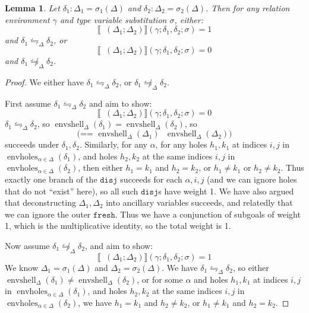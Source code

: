 \documentclass{report}
\newtheorem{lemma}{Lemma}
\theoremstyle{definition}
\newcommand{\den}[1]{\llbracket #1 \rrbracket}
\DeclareMathOperator{\envshell}{envshell}
\DeclareMathOperator{\envholes}{envholes}
\newcommand{\eqpat}{\leftrightharpoons}
\newcommand{\eqpatD}{\eqpat_{\Delta}}
\DeclareMathOperator{\enforceeqpatD}{enforce_{\eqpatD}}
\begin{document}
\begin{lemma}
	\label{lem:enforce_eqpat}
	Let \(\delta_1 : \Delta_1 = \sigma_1(\Delta)\) and \(\delta_2 : \Delta_2 = \sigma_2(\Delta)\).
	Then for any relation environment \(\gamma\) and type variable substitution \(\sigma\),
	either:
	\[
		\den{\enforceeqpatD(\Delta_1;\Delta_2)}(\gamma;\delta_1,\delta_2;\sigma) = 1
	\]
	and \(\delta_1 \eqpatD \delta_2\),
	or
	\[
		\den{\enforceeqpatD(\Delta_1;\Delta_2)}(\gamma;\delta_1,\delta_2;\sigma) = 0
	\]
	and \(\delta_1 \not\eqpatD \delta_2\).
\end{lemma}
\begin{proof}
	We either have \(\delta_1 \eqpatD \delta_2\), or \(\delta_1 \not\eqpatD \delta_2\).

	First assume \(\delta_1 \eqpatD \delta_2\) and aim to show:
	\begin{equation}
		\den{\enforceeqpatD(\Delta_1;\Delta_2)}(\gamma;\delta_1,\delta_2;\sigma) = 0
	\end{equation}
	\(\delta_1 \eqpatD \delta_2\), so \(\envshell_\Delta(\delta_1) = \envshell_\Delta(\delta_2)\),
	so
	\begin{equation}
		\texttt{(== \(\envshell_{\Delta}(\Delta_1)\) \(\envshell_{\Delta}(\Delta_2)\))}
	\end{equation}
	succeeds under \(\delta_1, \delta_2\).
	Similarly, for any \(\alpha\), for any holes \(h_1, k_1\) at indices \(i, j\) in \(\envholes_{\alpha \in \Delta}(\delta_1)\),
	and holes \(h_2, k_2\) at the same indices \(i, j\) in \(\envholes_{\alpha \in \Delta}(\delta_2)\),
	then either \(h_1 = k_1\) and \(h_2 = k_2\), or \(h_1 \ne k_1\) or \(h_2 \ne k_2\).
	Thus exactly one branch of the \(\texttt{disj}\) succeeds for each \(\alpha, i, j\) (and we can ignore holes that do not ``exist'' here), so all such \(\texttt{disj}\)s have weight 1.
	We have also argued that deconstructing \(\Delta_1, \Delta_2\) into ancillary variables succeeds, and relatedly that we can ignore the outer \(\texttt{fresh}\).
	Thus we have a conjunction of subgoals of weight 1, which is the multiplicative identity, so the total weight is 1.

	Now assume \(\delta_1 \not\eqpatD \delta_2\), and aim to show:
	\begin{equation}
		\den{\enforceeqpatD(\Delta_1;\Delta_2)}(\gamma;\delta_1,\delta_2;\sigma) = 1
	\end{equation}
	We know \(\Delta_1 = \sigma_1(\Delta)\) and \(\Delta_2 = \sigma_2(\Delta)\).
	We have \(\delta_1 \eqpatD \delta_2\), so either \(\envshell_\Delta(\delta_1) \ne \envshell_\Delta(\delta_2)\),
	or for some \(\alpha\) and holes \(h_1, k_1\) at indices \(i, j\) in \(\envholes_{\alpha \in \Delta}(\delta_1)\),
	and holes \(h_2, k_2\) at the same indices \(i, j\) in \(\envholes_{\alpha \in \Delta}(\delta_2)\),
	we have \(h_1 = k_1\) and \(h_2 \ne k_2\), or \(h_1 \ne k_1\) and \(h_2 = k_2\).
	

\end{proof}
\end{document}
